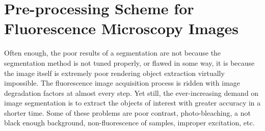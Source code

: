 
\chapter{Pre-processing Scheme for Fluorescence Microscopy Images} %

\label{chap:Chapter4} %



Often enough, the poor results of a segmentation are not because the segmentation method is not tuned properly, or flawed in some way, it is because the image itself is extremely poor rendering object extraction virtually impossible. 
The fluorescence image acquisition process is ridden with image degradation factors at almost every step.
Yet still, the ever-increasing demand on image segmentation is to extract the objects of interest with greater accuracy in a shorter time.
Some of these problems are poor contrast, photo-bleaching, a not black enough background, non-fluorescence of samples, improper excitation, etc.

